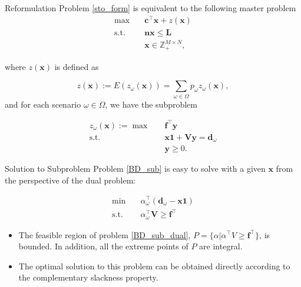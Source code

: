 \begin{frame}{Reformulation}
  \small
  Problem \eqref{sto_form} is equivalent to the following master problem
  \begin{equation}\label{BD_master}
    \begin{aligned}
  \max \quad & \mathbf{c}^{\intercal} \mathbf{x}+ z(\mathbf{x}) \\
  \text {s.t.} \quad & \mathbf{n} \mathbf{x} \leq \mathbf{L} \\
  & \mathbf{x} \in \mathbb{Z}_{+}^{M \times N},
  \end{aligned}
  \end{equation}

  where $z(\mathbf{x})$ is defined as 

$$z(\mathbf{x}) := E(z_{\omega}(\mathbf{x})) = \sum_{\omega \in \Omega} p_{\omega} z_{\omega}(\mathbf{x}),$$ and for each scenario $\omega \in \Omega$, we have the subproblem

  \begin{equation}\label{BD_sub}
    \begin{aligned}
      z_{\omega}(\mathbf{x}) := \max \quad & \mathbf{f}^{\intercal} \mathbf{y} \\
      \text {s.t.} \quad & \mathbf{x} \mathbf{1} + \mathbf{V} \mathbf{y} = \mathbf{d}_{\omega} \\
       & \mathbf{y} \geq 0.
    \end{aligned}
    \end{equation}
\end{frame}

\begin{frame}{Solution to Subproblem}
  Problem \eqref{BD_sub} is easy to solve with a given $\mathbf{x}$ from the perspective of the dual problem:

  \begin{equation}\label{BD_sub_dual}
    \begin{aligned}
      \min \quad & \alpha^{\intercal}_{\omega} (\mathbf{d}_{\omega}- \mathbf{x} \mathbf{1}) \\
      \text {s.t.} \quad & \alpha^{\intercal}_{\omega} \mathbf{V} \geq \mathbf{f}^{\intercal}
    \end{aligned}
    \end{equation}

    \begin{itemize}
      \item The feasible region of problem \eqref{BD_sub_dual}, $P= \{\alpha|\alpha^{\intercal} V \geq \mathbf{f}^{\intercal}\}$, is bounded. In addition, all the extreme points of $P$ are integral.
      \item The optimal solution to this problem can be obtained directly according to the complementary slackness property.
    \end{itemize}
\end{frame}

